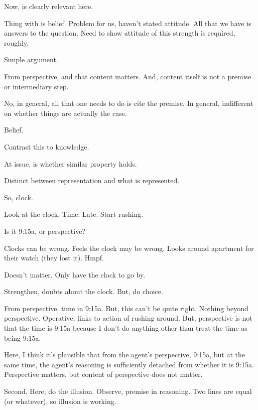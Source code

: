 \begin{note}
  Now, \citeauthor{Collins:1997wn} is clearly relevant here.

  Thing with \citeauthor{Collins:1997wn} is belief.
  Problem for us, haven't stated attitude.
  All that we have is answers to the question.
  Need to show attitude of this strength is required, roughly.
\end{note}

\begin{note}
  Simple argument.

  From perspective, and that content matters.
  And, content itself is not a premise or intermediary step.

  No, in general, all that one needs to do is cite the premise.
  In general, indifferent on whether things are actually the case.

  Belief.

  Contrast this to knowledge.

  At issue, is whether similar property holds.
\end{note}

\begin{note}
  Distinct between representation and what is represented.

  So, clock.

  Look at the clock.
  Time.
  Late.
  Start rushing.

  Is it 9:15a, or perspective?

  Clocks can be wrong.
  Feels the clock may be wrong.
  Looks around apartment for their watch (they lost it).
  Hmpf.

  Doesn't matter.
  Only have the clock to go by.

  Strengthen, doubts about the clock.
  But, do choice.

  From perspective, time in 9:15a.
  But, this can't be quite right.
  Nothing beyond perspective.
  Operative, links to action of rushing around.
  But, perspective is not that the time is 9:15a because I don't do anything other than treat the time as being 9:15a.

  Here, I think it's plausible that from the agent's perspective, 9:15a, but at the same time, the agent's reasoning is sufficiently detached from whether it is 9:15a.
  Perspective matters, but content of perspective does not matter.
\end{note}

\begin{note}
  Second.
  Here, do the illusion.
  Observe, premise in reasoning.
  Two lines are equal (or whatever), so illusion is working.
\end{note}

